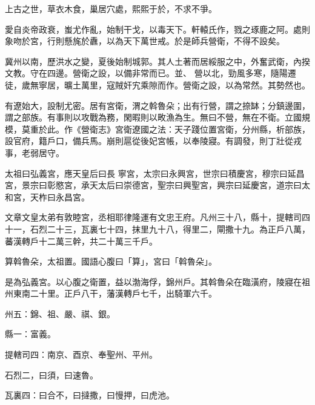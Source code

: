 
\begin{pinyinscope}

 上古之世，草衣木食，巢居穴處，熙熙于於，不求不爭。



 愛自炎帝政衰，蚩尤作亂，始制干戈，以毒天下。軒轅氏作，戮之琢鹿之阿。處則象吻於宮，行則懸旄於纛，以為天下萬世戒。於是師兵營衛，不得不設矣。



 冀州以南，歷洪水之變，夏後始制城郭。其人土著而居綏服之中，外奮武衛，內揆文教。守在四邊。營衛之設，以備非常而已。並、
 營以北，勁風多寒，隨陽遷徒，歲無寧居，曠土萬里，寇賊奸宄乘隙而作。營衛之設，以為常然。其勢然也。



 有遼始大，設制尤密。居有宮衛，渭之斡魯朵；出有行營，謂之捺缽；分鎮邊圍，謂之部族。有事則以攻戰為務，閑暇則以畋漁為生。無曰不營，無在不衛。立國規模，莫重於此。作《營衛志》宮衛遼國之法：天子踐位置宮衛，分州縣，析部族，設官府，籍戶口，備兵馬。崩則扈從後妃宮帳，以奉陵寢。有調發，則丁壯從戎事，老弱居守。



 太祖曰弘義宮，應天皇后曰長
 寧宮，太宗曰永興宮，世宗曰積慶宮，穆宗曰延昌宮，景宗曰彰愍宮，承天太后曰崇德宮，聖宗曰興聖宮，興宗曰延慶宮，道宗曰太和宮，天柞曰永昌宮。



 文章文皇太弟有敦睦宮，丞相耶律隆運有文忠王府。凡州三十八，縣十，提轄司四十一，石烈二十三，瓦裏七十四，抹里九十八，得里二，閘撒十九。為正戶八萬，蕃漢轉戶十二萬三幹，共二十萬三千戶。



 算斡魯朵，太祖置。國語心腹曰「算」，宮曰「斡魯朵」。



 是為弘義宮。以心腹之衛置，益以渤海俘，錦州戶。其斡魯朵在臨潢府，陵寢在祖州東南二十里。正戶八干，藩漢轉戶七千，出騎軍六千。



 州五：錦、祖、嚴、祺、銀。



 縣一：富義。



 提轄司四：南京、酉京、奉聖州、平州。



 石烈二，曰須，曰速魯。



 瓦裏四：曰合不，曰撻撒，曰慢押，曰虎池。




\end{pinyinscope}
